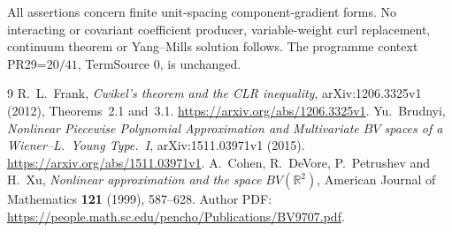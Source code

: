 \documentclass[11pt]{article}
\newcommand{\R}{\mathbb R}
\begin{document}
All assertions concern finite unit-spacing component-gradient forms.
No interacting or covariant coefficient producer, variable-weight curl
replacement, continuum theorem or Yang--Mills solution follows. The programme
context PR29=$20/41$, TermSource $0$, is unchanged.





\appendix

\begin{thebibliography}{9}
 R.~L.~Frank,
\emph{Cwikel's theorem and the CLR inequality}, arXiv:1206.3325v1 (2012),
Theorems~2.1 and~3.1. \url{https://arxiv.org/abs/1206.3325v1}.
 Yu.~Brudnyi,
\emph{Nonlinear Piecewise Polynomial Approximation and Multivariate $BV$
spaces of a Wiener--L.~Young Type.~I}, arXiv:1511.03971v1 (2015).
\url{https://arxiv.org/abs/1511.03971v1}.
 A.~Cohen, R.~DeVore, P.~Petrushev and H.~Xu,
\emph{Nonlinear approximation and the space $BV(\R^2)$},
American Journal of Mathematics \textbf{121} (1999), 587--628.
Author PDF: \url{https://people.math.sc.edu/pencho/Publications/BV9707.pdf}.
\end{thebibliography}
\end{document}
